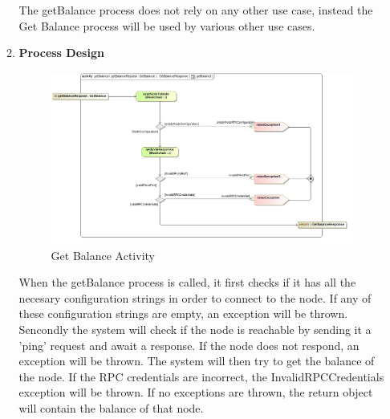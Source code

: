 \begin{enumerate}
\begin{enumerate}
			The getBalance process does not rely on any other use case, instead the Get Balance process will be used by various other use cases.
			\newline
			
			\item \textbf{Process Design}
			\begin{figure}[H]
				\centering
				\includegraphics[width=0.75\linewidth]{../Images/Blockchain/Activity/getBalance.jpg}
				\caption{Get Balance Activity}
			\end{figure}
			
				When the getBalance process is called, it first checks if it has all the necesary configuration strings in order to connect to the node. If any of these configuration strings are empty, an exception will be thrown. Sencondly the system will check if the node is reachable by sending it a 'ping' request and await a response. If the node does not respond, an exception will be thrown.
				The system will then try to get the balance of the node. If the RPC credentials are incorrect, the InvalidRPCCredentials exception will be thrown. If no exceptions are thrown, the return object will contain the balance of that node.
			\newline
		\end{enumerate}
\end{enumerate}